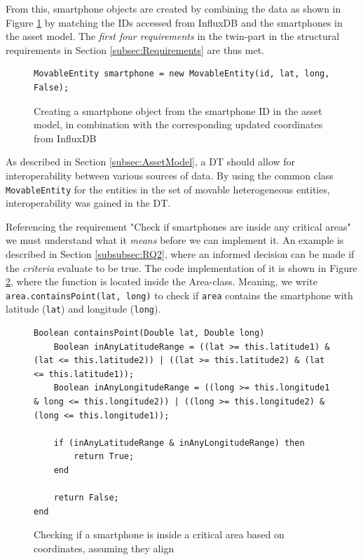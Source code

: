 \documentclass{article}
\begin{document}
From this, smartphone objects are created by combining the data as shown in Figure \ref{fig:smartphone_object} by matching the IDs accessed from InfluxDB and the smartphones in the asset model. The \emph{first four requirements} in the twin-part in the structural requirements in Section \ref{subsec:Requirements} are thus met. 

\begin{figure}[H]
    \centering
    \begin{verbatim}
MovableEntity smartphone = new MovableEntity(id, lat, long, False);
    \end{verbatim}
    \caption{Creating a smartphone object from the smartphone ID in the asset model, in combination with the corresponding updated coordinates from InfluxDB}
    \label{fig:smartphone_object}
\end{figure}

As described in Section \ref{subsec:AssetModel}, a DT should allow for interoperability between various sources of data. By using the common class \verb|MovableEntity| for the entities in the set of movable heterogeneous entities, interoperability was gained in the DT.

Referencing the requirement "Check if smartphones are inside any critical areas" we must understand what it \emph{means} before we can implement it. An example is described in Section \ref{subsubsec:RQ2}, where an informed decision can be made if the \emph{criteria} evaluate to be true. The code implementation of it is shown in Figure \ref{fig:inside_critical_area}, where the function is located inside the Area-class. Meaning, we write \verb|area.containsPoint(lat, long)| to check if \verb|area| contains the smartphone with latitude (\verb|lat|) and longitude (\verb|long|).


\begin{figure}[H]
    \centering
    \begin{small}
    \begin{Verbatim}[frame=single,breaklines]
Boolean containsPoint(Double lat, Double long)
    Boolean inAnyLatitudeRange = ((lat >= this.latitude1) & (lat <= this.latitude2)) | ((lat >= this.latitude2) & (lat <= this.latitude1));
    Boolean inAnyLongitudeRange = ((long >= this.longitude1 & long <= this.longitude2)) | ((long >= this.longitude2) & (long <= this.longitude1));

    if (inAnyLatitudeRange & inAnyLongitudeRange) then
        return True;
    end
        
    return False;
end
    \end{Verbatim}
    \end{small}
    \caption{Checking if a smartphone is inside a critical area based on coordinates, assuming they align}
    \label{fig:inside_critical_area}
\end{figure}
\end{document}
